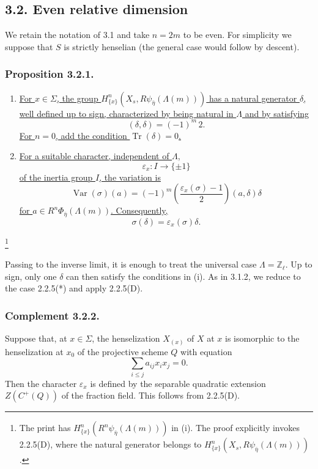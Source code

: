 \subsection*{3.2. Even relative dimension}

We retain the notation of 3.1 and take $n=2m$ to be even.  For
simplicity we suppose that $S$ is strictly henselian (the general
case would follow by descent).

\subsubsection*{Proposition 3.2.1.}
\begin{enumerate}
\item[(i)] \underline{For $x\in\Sigma$, the group
$H^n_{\{x\}}(X_s,R\psi_{\bar\eta}(\Lambda(m)))$ has a natural
generator $\delta$, well defined up to sign, characterized by being
natural in $\Lambda$ and by satisfying}
\[
(\delta,\delta)=(-1)^m\,2.
\]
\underline{For $n=0$, add the condition
$\operatorname{Tr}(\delta)=0$.}

\item[(ii)] \underline{For a suitable character, independent of
$\Lambda$,}
\[
\varepsilon_x:I\longrightarrow\{\pm1\}
\]
\underline{of the inertia group $I$, the variation is}
\[
\operatorname{Var}(\sigma)(a)
=(-1)^m\left(\frac{\varepsilon_x(\sigma)-1}{2}\right)
(a,\delta)\delta
\]
\underline{for $a\in R^n\Phi_{\bar\eta}(\Lambda(m))$.  Consequently,}
\[
\sigma(\delta)=\varepsilon_x(\sigma)\delta.
\]
\end{enumerate}
\footnote{The print has
$H^n_{\{x\}}(R^n\psi_{\bar\eta}(\Lambda(m)))$ in (i).  The proof
explicitly invokes 2.2.5(D), where the natural generator belongs to
$H^n_{\{x\}}(X_s,R\psi_{\bar\eta}(\Lambda(m)))$.}

Passing to the inverse limit, it is enough to treat the universal
case $\Lambda=\mathbb Z_\ell$.  Up to sign, only one $\delta$ can
then satisfy the conditions in (i).  As in 3.1.2, we reduce to the
case 2.2.5(*) and apply 2.2.5(D).

\subsubsection*{Complement 3.2.2.}
Suppose that, at $x\in\Sigma$, the henselization $X_{(x)}$ of $X$ at
$x$ is isomorphic to the henselization at $x_0$ of the projective
scheme $Q$ with equation
\[
\sum_{i\leq j}a_{ij}x_ix_j=0.
\]
Then the character $\varepsilon_x$ is defined by the separable
quadratic extension $Z(C^+(Q))$ of the fraction field.  This follows
from 2.2.5(D).

